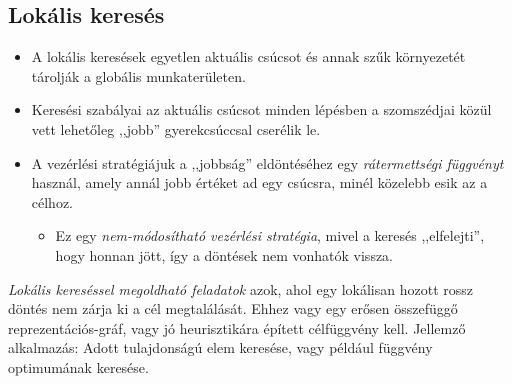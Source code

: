 \documentclass[12pt,margin=0px]{article}
\begin{document}
	\subsection*{Lokális keresés}

	\begin{itemize}
    	\item A lokális keresések egyetlen aktuális csúcsot és annak szűk környezetét tárolják a globális munkaterületen.
        \item Keresési szabályai az aktuális csúcsot minden lépésben a szomszédjai közül vett lehetőleg  ,,jobb” gyerekcsúccsal cserélik le.
        \item A vezérlési stratégiájuk a ,,jobbság” eldöntéséhez egy \textit{rátermettségi függvényt} használ, amely annál jobb értéket ad egy csúcsra, minél közelebb esik az a célhoz.
        \begin{itemize}
            \item Ez egy \textit{nem-módosítható vezérlési stratégia}, mivel a keresés ,,elfelejti”, hogy honnan jött, így a döntések nem vonhatók vissza.
        \end{itemize}
    \end{itemize}
	\emph{Lokális kereséssel megoldható feladatok} azok, ahol egy lokálisan hozott rossz döntés nem zárja ki a cél megtalálását. Ehhez vagy egy erősen összefüggő reprezentációs-gráf, vagy jó heurisztikára épített
	célfüggvény kell. Jellemző alkalmazás:  Adott tulajdonságú elem keresése, vagy például függvény optimumának keresése.\\
\end{document}
